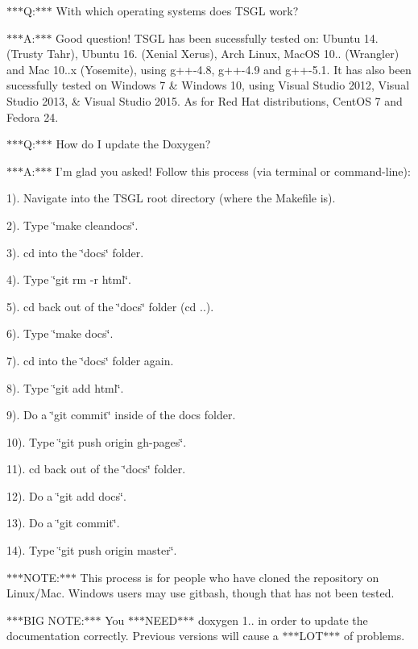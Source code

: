 $\ast$$\ast$$\ast$\-Q\-:$\ast$$\ast$$\ast$ With which operating systems does T\-S\-G\-L work?

$\ast$$\ast$$\ast$\-A\-:$\ast$$\ast$$\ast$ Good question! T\-S\-G\-L has been sucessfully tested on\-: Ubuntu 14. (Trusty Tahr), Ubuntu 16. (Xenial Xerus), Arch Linux, Mac\-O\-S 10.. (Wrangler) and Mac 10..\-x (Yosemite), using g++-\/4.8, g++-\/4.9 and g++-\/5.1. It has also been sucessfully tested on Windows 7 \& Windows 10, using Visual Studio 2012, Visual Studio 2013, \& Visual Studio 2015. As for Red Hat distributions, Cent\-O\-S 7 and Fedora 24.

$\ast$$\ast$$\ast$\-Q\-:$\ast$$\ast$$\ast$ How do I update the Doxygen?

$\ast$$\ast$$\ast$\-A\-:$\ast$$\ast$$\ast$ I'm glad you asked! Follow this process (via terminal or command-\/line)\-:

1). Navigate into the T\-S\-G\-L root directory (where the Makefile is).

2). Type \char`\"{}make cleandocs\char`\"{}.

3). cd into the \char`\"{}docs\char`\"{} folder.

4). Type \char`\"{}git rm -\/r html\char`\"{}.

5). cd back out of the \char`\"{}docs\char`\"{} folder (cd ..).

6). Type \char`\"{}make docs\char`\"{}.

7). cd into the \char`\"{}docs\char`\"{} folder again.

8). Type \char`\"{}git add html\char`\"{}.

9). Do a \char`\"{}git commit\char`\"{} inside of the docs folder.

10). Type \char`\"{}git push origin gh-\/pages\char`\"{}.

11). cd back out of the \char`\"{}docs\char`\"{} folder.

12). Do a \char`\"{}git add docs\char`\"{}.

13). Do a \char`\"{}git commit\char`\"{}.

14). Type \char`\"{}git push origin master\char`\"{}.

$\ast$$\ast$$\ast$\-N\-O\-T\-E\-:$\ast$$\ast$$\ast$ This process is for people who have cloned the repository on Linux/\-Mac. Windows users may use gitbash, though that has not been tested.

$\ast$$\ast$$\ast$\-B\-I\-G N\-O\-T\-E\-:$\ast$$\ast$$\ast$ You $\ast$$\ast$$\ast$\-N\-E\-E\-D$\ast$$\ast$$\ast$ doxygen 1.. in order to update the documentation correctly. Previous versions will cause a $\ast$$\ast$$\ast$\-L\-O\-T$\ast$$\ast$$\ast$ of problems. 